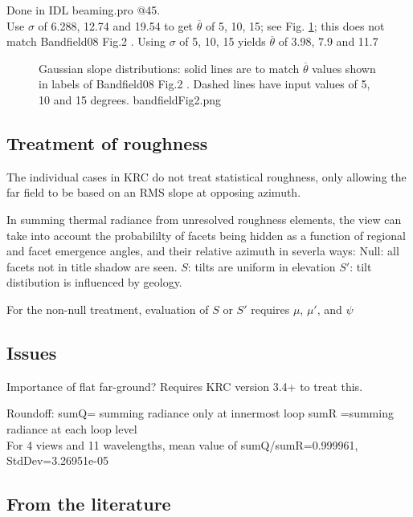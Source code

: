 \documentclass{article}
\begin{document}
Done in IDL beaming.pro @45. \\ Use $\sigma$ of 6.288, 12.74 and 19.54 to get
$\overline{\theta}$ of 5, 10, 15; see Fig. \ref{bandfieldFig2}; this does not
match Bandfield08 Fig.2 .  Using $\sigma$ of 5, 10, 15 yields
$\overline{\theta}$ of 3.98, 7.9 and 11.7

\begin{figure}[!ht] 
\caption[Gaussian slopes ]{Gaussian slope distributions: solid lines are to
  match $\overline{\theta}$ values shown in labels of Bandfield08 Fig.2 . Dashed
  lines have input values of 5, 10 and 15 degrees.
\label{bandfieldFig2} bandfieldFig2.png  }
\end{figure} 


\subsection{Treatment of roughness}  %

The individual cases in KRC do not treat statistical roughness, only allowing
the far field to be based on an RMS slope at opposing azimuth.

In summing thermal radiance from unresolved roughness elements, the view can
take into account the probabililty of facets being hidden as a function of
regional and facet emergence angles, and their relative azimuth in severla ways:
\qi Null: all facets not in title shadow are seen. 
\qi $S$: tilts are uniform in elevation 
\qi $S'$: tilt distibution is influenced by geology.

For the non-null treatment, evaluation of $S$ or $S'$ requires $\mu$, $\mu'$,
and $\psi$

\subsection{Issues}  %
Importance of  flat far-ground? Requires KRC version 3.4+ to treat this.

 Roundoff:
\qi sumQ= summing radiance only at innermost loop 
\qi sumR =summing radiance at each loop level
\\ For 4 views and 11 wavelengths, mean value of sumQ/sumR=0.999961, StdDev=3.26951e-05

\subsection{From the literature}
\end{document}
